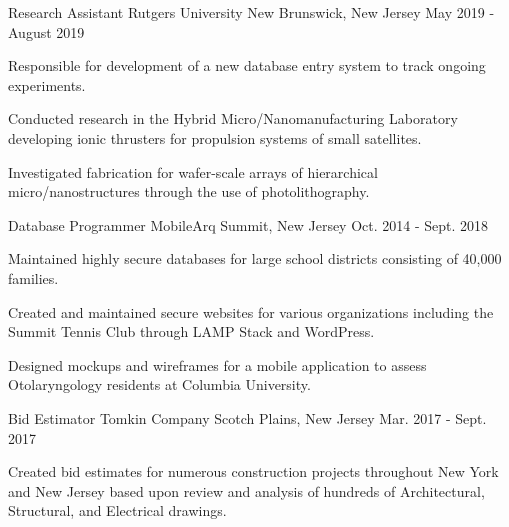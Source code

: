 \begin{cventries}
\vspace{-1mm}
  \cventry
    {Research Assistant}
    {Rutgers University}
    {New Brunswick, New Jersey}
    {May 2019 - August 2019}
    {
      \begin{cvitems}
        \item {Responsible for development of a new database entry system to track ongoing experiments.}
             \vspace{1mm}
        \item {Conducted research in the Hybrid Micro/Nanomanufacturing Laboratory developing ionic thrusters for propulsion systems of small satellites.}
             \vspace{1mm}
        \item {Investigated fabrication for wafer-scale arrays of hierarchical micro/nanostructures through the use of photolithography.}
      \end{cvitems}
    }
        \vspace{-0.5mm}
  \cventry
    {Database Programmer}
    {MobileArq}
    {Summit, New Jersey}
    {Oct. 2014 - Sept. 2018}
    {
      \begin{cvitems}
        \item {Maintained highly secure databases for large school districts consisting of 40,000 families.}
             \vspace{1mm}
        \item {Created and maintained secure websites for various organizations including the Summit Tennis Club through LAMP Stack and WordPress.} 
             \vspace{1mm}
        \item {Designed mockups and wireframes for a mobile application to assess Otolaryngology residents at Columbia University.}
      \end{cvitems}
    }
  \cventry
    {Bid Estimator}
    {Tomkin Company}
    {Scotch Plains, New Jersey}
    {Mar. 2017 - Sept. 2017}
    {
      \begin{cvitems}
        \item {Created bid estimates for numerous construction projects throughout New York and New Jersey based upon review and analysis of hundreds of Architectural, Structural, and Electrical drawings.}

\end{cvitems}}
\end{cventries}
